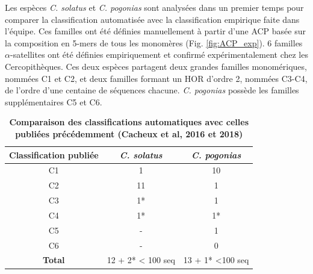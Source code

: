 \documentclass[12pt,a4paper]{article}
\begin{document}
	Les espèces \textit{C. solatus} et \textit{C. pogonias} sont analysées dans un premier temps pour comparer la classification automatisée avec la classification empirique faite dans l'équipe. Ces familles ont été définies manuellement à partir d'une ACP basée sur la composition en 5-mers de tous les monomères (Fig. \ref{fig:ACP_exp}). 6 familles $\alpha$-satellites ont été définies empiriquement et confirmé expérimentalement chez les Cercopithèques. Ces deux espèces partagent deux grandes familles monomériques, nommées C1 et C2, et deux familles formant un HOR d'ordre 2, nommées C3-C4, de l'ordre d'une centaine de séquences chacune. \textit{C. pogonias} possède les familles supplémentaires C5 et C6.
	
		\begin{table}
			\center
			\begin{tabular}{|c|c|c|}
	    	\hline
			\textbf{Classification publiée} &  \textbf{\textit{C. solatus}}  & \textbf{\textit{C. pogonias}}\\
			\hline
			C1 &  1  & 10\\
			\hline
			C2 & 11  & 1 \\
			\hline
			C3 & 1* & 1 \\
			\hline
			C4 & 1* & 1* \\
			\hline
			C5 & - 	 &  1 \\
			\hline
			C6 & -   &  0 \\
			\hline
			\textbf{Total} & 12 + 2* < 100 seq  &  13 + 1* <100 seq \\
			\hline
		\end{tabular}
		\caption{\textbf{Comparaison des classifications automatiques avec celles publiées précédemment (Cacheux et al, 2016 et 2018)}}
		\label{tab_count_fam}
	\end{table}
		
\end{document}
